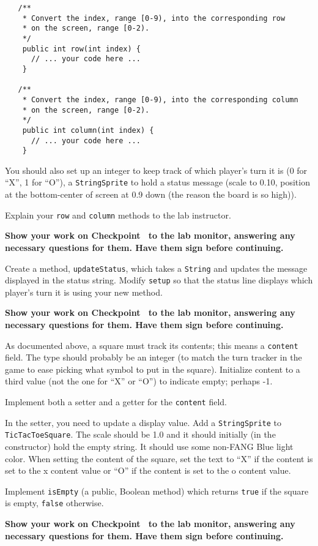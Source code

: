 \documentclass[12pt,oneside]{memoir}
\newcommand\code[1]{\lstinline^#1^}
\newenvironment{Checkpoint}[1]{%
  \begin{Exercise}[name={Checkpoint},title={#1}]}{%
  \end{Exercise}%
  \textbf{Show your work on Checkpoint~\theExercise{} to the lab monitor, %
    answering any necessary questions for them.  Have them sign before continuing.}}
\begin{document}
\begin{Checkpoint}{Define classes}
  \begin{lstlisting}
   /**
    * Convert the index, range [0-9), into the corresponding row 
    * on the screen, range [0-2).
    */
    public int row(int index) {
      // ... your code here ...
    }

   /**
    * Convert the index, range [0-9), into the corresponding column
    * on the screen, range [0-2).
    */
    public int column(int index) {
      // ... your code here ...
    }
  \end{lstlisting}

  You should also set up an integer to keep track of which player's
  turn it is (0 for ``X'', 1 for ``O''), a \code{StringSprite} to hold
  a status message (scale to 0.10, position at the bottom-center of
  screen at 0.9 down (the reason the board is so high)).

  Explain your \code{row} and \code{column} methods to the lab
  instructor.
\end{Checkpoint}

\begin{Checkpoint}{Update status.}
  Create a method, \code{updateStatus}, which takes a \code{String}
  and updates the message displayed in the status string. Modify
  \code{setup} so that the status line displays which player's turn it
  is using your new method.
\end{Checkpoint}

\begin{Checkpoint}{Square state}
  As documented above, a square must track its contents; this means a
  \code{content} field. The type should probably be an integer (to
  match the turn tracker in the game to ease picking what symbol to
  put in the square). Initialize content to a third value (not the one
  for ``X'' or ``O'') to indicate empty; perhaps -1.

  Implement both a setter and a getter for the \code{content}
  field. 

  In the setter, you need to update a display value. Add a
  \code{StringSprite} to \code{TicTacToeSquare}. The scale should be
  1.0 and it should initially (in the constructor) hold the empty
  string. It should use some non-FANG Blue light color. When setting
  the content of the square, set the text to ``X'' if the content is
  set to the x content value or ``O'' if the content is set to the o
  content value.

  Implement \code{isEmpty} (a public, Boolean method) which returns
  \code{true} if the square is empty, \code{false} otherwise.
\end{Checkpoint}
\end{document}
